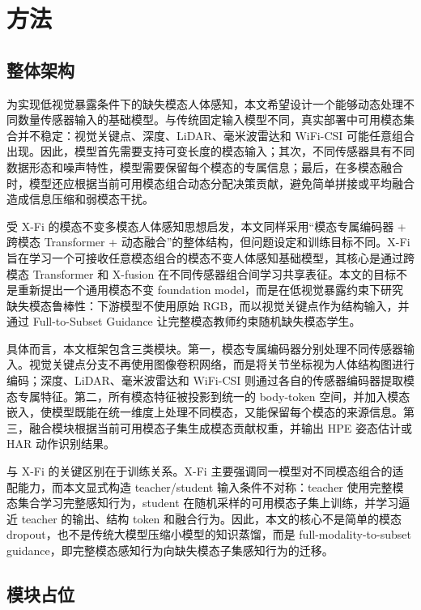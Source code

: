 \documentclass[journal]{IEEEtran}
\begin{document}
\section{方法}

\subsection{整体架构}
为实现低视觉暴露条件下的缺失模态人体感知，本文希望设计一个能够动态处理不同数量传感器输入的基础模型。与传统固定输入模型不同，真实部署中可用模态集合并不稳定：视觉关键点、深度、LiDAR、毫米波雷达和 WiFi-CSI 可能任意组合出现。因此，模型首先需要支持可变长度的模态输入；其次，不同传感器具有不同数据形态和噪声特性，模型需要保留每个模态的专属信息；最后，在多模态融合时，模型还应根据当前可用模态组合动态分配决策贡献，避免简单拼接或平均融合造成信息压缩和弱模态干扰。

受 X-Fi 的模态不变多模态人体感知思想启发，本文同样采用“模态专属编码器 + 跨模态 Transformer + 动态融合”的整体结构，但问题设定和训练目标不同。X-Fi 旨在学习一个可接收任意模态组合的模态不变人体感知基础模型，其核心是通过跨模态 Transformer 和 X-fusion 在不同传感器组合间学习共享表征。本文的目标不是重新提出一个通用模态不变 foundation model，而是在低视觉暴露约束下研究缺失模态鲁棒性：下游模型不使用原始 RGB，而以视觉关键点作为结构输入，并通过 Full-to-Subset Guidance 让完整模态教师约束随机缺失模态学生。

具体而言，本文框架包含三类模块。第一，模态专属编码器分别处理不同传感器输入。视觉关键点分支不再使用图像卷积网络，而是将关节坐标视为人体结构图进行编码；深度、LiDAR、毫米波雷达和 WiFi-CSI 则通过各自的传感器编码器提取模态专属特征。第二，所有模态特征被投影到统一的 body-token 空间，并加入模态嵌入，使模型既能在统一维度上处理不同模态，又能保留每个模态的来源信息。第三，融合模块根据当前可用模态子集生成模态贡献权重，并输出 HPE 姿态估计或 HAR 动作识别结果。

与 X-Fi 的关键区别在于训练关系。X-Fi 主要强调同一模型对不同模态组合的适配能力，而本文显式构造 teacher/student 输入条件不对称：teacher 使用完整模态集合学习完整感知行为，student 在随机采样的可用模态子集上训练，并学习逼近 teacher 的输出、结构 token 和融合行为。因此，本文的核心不是简单的模态 dropout，也不是传统大模型压缩小模型的知识蒸馏，而是 full-modality-to-subset guidance，即完整模态感知行为向缺失模态子集感知行为的迁移。

\subsection{模块占位}
\end{document}
